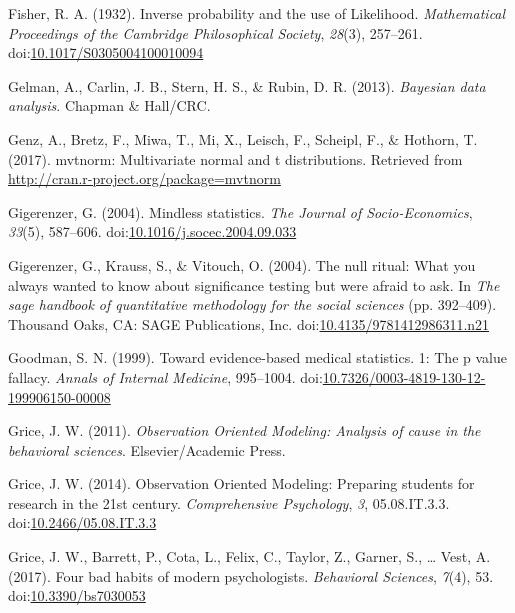 \documentclass[,man, mask]{apa6}
\begin{document}
\leavevmode\hypertarget{ref-Fisher1932}{}%
Fisher, R. A. (1932). Inverse probability and the use of Likelihood. \emph{Mathematical Proceedings of the Cambridge Philosophical Society}, \emph{28}(3), 257--261. doi:\href{https://doi.org/10.1017/S0305004100010094}{10.1017/S0305004100010094}

\leavevmode\hypertarget{ref-Gelman2004}{}%
Gelman, A., Carlin, J. B., Stern, H. S., \& Rubin, D. R. (2013). \emph{Bayesian data analysis}. Chapman \& Hall/CRC.

\leavevmode\hypertarget{ref-Genz2017}{}%
Genz, A., Bretz, F., Miwa, T., Mi, X., Leisch, F., Scheipl, F., \& Hothorn, T. (2017). mvtnorm: Multivariate normal and t distributions. Retrieved from \url{http://cran.r-project.org/package=mvtnorm}

\leavevmode\hypertarget{ref-Gigerenzer2004}{}%
Gigerenzer, G. (2004). Mindless statistics. \emph{The Journal of Socio-Economics}, \emph{33}(5), 587--606. doi:\href{https://doi.org/10.1016/j.socec.2004.09.033}{10.1016/j.socec.2004.09.033}

\leavevmode\hypertarget{ref-Gigerenzer2004a}{}%
Gigerenzer, G., Krauss, S., \& Vitouch, O. (2004). The null ritual: What you always wanted to know about significance testing but were afraid to ask. In \emph{The sage handbook of quantitative methodology for the social sciences} (pp. 392--409). Thousand Oaks, CA: SAGE Publications, Inc. doi:\href{https://doi.org/10.4135/9781412986311.n21}{10.4135/9781412986311.n21}

\leavevmode\hypertarget{ref-Goodman1999}{}%
Goodman, S. N. (1999). Toward evidence-based medical statistics. 1: The p value fallacy. \emph{Annals of Internal Medicine}, 995--1004. doi:\href{https://doi.org/10.7326/0003-4819-130-12-199906150-00008}{10.7326/0003-4819-130-12-199906150-00008}

\leavevmode\hypertarget{ref-Grice2011}{}%
Grice, J. W. (2011). \emph{Observation Oriented Modeling: Analysis of cause in the behavioral sciences}. Elsevier/Academic Press.

\leavevmode\hypertarget{ref-Grice2014}{}%
Grice, J. W. (2014). Observation Oriented Modeling: Preparing students for research in the 21st century. \emph{Comprehensive Psychology}, \emph{3}, 05.08.IT.3.3. doi:\href{https://doi.org/10.2466/05.08.IT.3.3}{10.2466/05.08.IT.3.3}

\leavevmode\hypertarget{ref-Grice2017}{}%
Grice, J. W., Barrett, P., Cota, L., Felix, C., Taylor, Z., Garner, S., \ldots{} Vest, A. (2017). Four bad habits of modern psychologists. \emph{Behavioral Sciences}, \emph{7}(4), 53. doi:\href{https://doi.org/10.3390/bs7030053}{10.3390/bs7030053}
\end{document}
